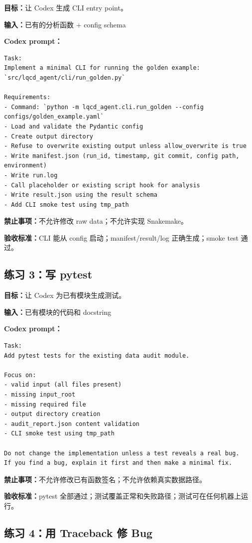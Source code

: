 \documentclass[11pt,a4paper,fontset=fandol]{ctexart}
\begin{document}
\textbf{目标：}让 Codex 生成 CLI entry point。

\textbf{输入：}已有的分析函数 + config schema

\textbf{Codex prompt：}
\begin{lstlisting}
Task:
Implement a minimal CLI for running the golden example:
`src/lqcd_agent/cli/run_golden.py`

Requirements:
- Command: `python -m lqcd_agent.cli.run_golden --config configs/golden_example.yaml`
- Load and validate the Pydantic config
- Create output directory
- Refuse to overwrite existing output unless allow_overwrite is true
- Write manifest.json (run_id, timestamp, git commit, config path, environment)
- Write run.log
- Call placeholder or existing script hook for analysis
- Write result.json using the result schema
- Add CLI smoke test using tmp_path
\end{lstlisting}

\textbf{禁止事项：}不允许修改 raw data；不允许实现 Snakemake。

\textbf{验收标准：}CLI 能从 config 启动；manifest/result/log 正确生成；smoke test 通过。

\subsection{练习 3：写 pytest}

\textbf{目标：}让 Codex 为已有模块生成测试。

\textbf{输入：}已有模块的代码和 docstring

\textbf{Codex prompt：}
\begin{lstlisting}
Task:
Add pytest tests for the existing data audit module.

Focus on:
- valid input (all files present)
- missing input_root
- missing required file
- output directory creation
- audit_report.json content validation
- CLI smoke test using tmp_path

Do not change the implementation unless a test reveals a real bug.
If you find a bug, explain it first and then make a minimal fix.
\end{lstlisting}

\textbf{禁止事项：}不允许修改已有函数签名；不允许依赖真实数据路径。

\textbf{验收标准：}pytest 全部通过；测试覆盖正常和失败路径；测试可在任何机器上运行。

\subsection{练习 4：用 Traceback 修 Bug}
\end{document}
